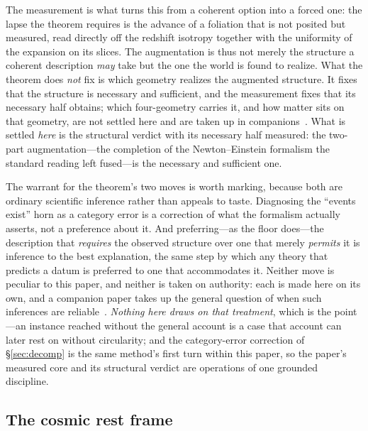 \documentclass[11pt,a4paper]{article}
\begin{document}
\noindent The measurement is what turns this from a coherent option into a forced one: the lapse the theorem requires is the advance of a foliation that is not posited but measured, read directly off the redshift isotropy together with the uniformity of the expansion on its slices. The augmentation is thus not merely the structure a coherent description \emph{may} take but the one the world is found to realize. What the theorem does \emph{not} fix is which geometry realizes the augmented structure. It fixes that the structure is necessary and sufficient, and the measurement fixes that its necessary half obtains; which four-geometry carries it, and how matter sits on that geometry, are not settled here and are taken up in companions~\cite{JanzenCRframework, JanzenOperator, JanzenRange, JanzenGeometricCore}. What is settled \emph{here} is the structural verdict with its necessary half measured: the two-part augmentation---the completion of the Newton--Einstein formalism the standard reading left fused---is the necessary and sufficient one.

\noindent The warrant for the theorem's two moves is worth marking, because both are ordinary scientific inference rather than appeals to taste. Diagnosing the ``events exist'' horn as a category error is a correction of what the formalism actually asserts, not a preference about it. And preferring---as the floor does---the description that \emph{requires} the observed structure over one that merely \emph{permits} it is inference to the best explanation, the same step by which any theory that predicts a datum is preferred to one that accommodates it. Neither move is peculiar to this paper, and neither is taken on authority: each is made here on its own, and a companion paper takes up the general question of when such inferences are reliable~\cite{JanzenShadowExistence}. \emph{Nothing here draws on that treatment}, which is the point---an instance reached without the general account is a case that account can later rest on without circularity; and the category-error correction of \S\ref{sec:decomp} is the same method's first turn within this paper, so the paper's measured core and its structural verdict are operations of one grounded discipline.

\subsection{The cosmic rest frame}\label{sec:restframe}
\end{document}
